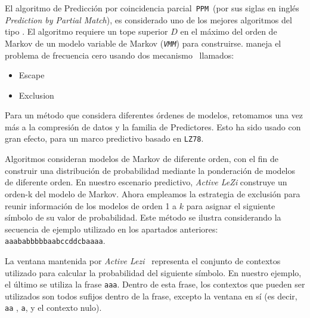 


El algoritmo de Predicción por coincidencia parcial~\texttt{PPM}~(por sus siglas en inglés \emph{Prediction by Partial Match}), es considerado uno de los mejores algoritmos del tipo \losslessdatacompression. El algoritmo requiere un tope superior $D$ en el máximo del orden de Markov de un modelo variable de Markov (\emph{\texttt{VMM}}) para construirse. \PPM maneja el problema de frecuencia cero usando dos mecanismo~\cite{Begleiter2004} llamados:
	\begin{itemize}
		\menorEspacioItemize
		\item Escape
		\item Exclusion
	\end{itemize}
	
Para un método que considera diferentes órdenes de modelos, retomamos una vez más a la compresión de datos y la familia de Predictores.  Esto ha sido usado con gran efecto, para un marco predictivo basado en \texttt{LZ78}. 

Algoritmos  \PPM consideran modelos de Markov de diferente orden,  con el fin de construir una distribución de probabilidad mediante la ponderación de modelos de diferente orden. En nuestro escenario predictivo, \emph{Active LeZi} construye un orden-k del modelo de Markov. Ahora empleamos la estrategia \PPM de exclusión para reunir información de los modelos de orden 1 a $k$ para asignar el siguiente símbolo de su valor de probabilidad. Este método se ilustra considerando la secuencia de ejemplo utilizado en los apartados anteriores: \texttt{aaababbbbbaabccddcbaaaa}.

La ventana mantenida por \emph{Active Lezi}~\cite{Gopalratnam2007} representa el conjunto de contextos utilizado para calcular la probabilidad  del siguiente símbolo. En nuestro ejemplo, el último se utiliza la frase \texttt{aaa}. Dentro de esta frase, los contextos que pueden ser utilizados son todos sufijos dentro de la frase, excepto la ventana en sí (es decir, \texttt{aa} , \texttt{a}, y el contexto nulo).

	
